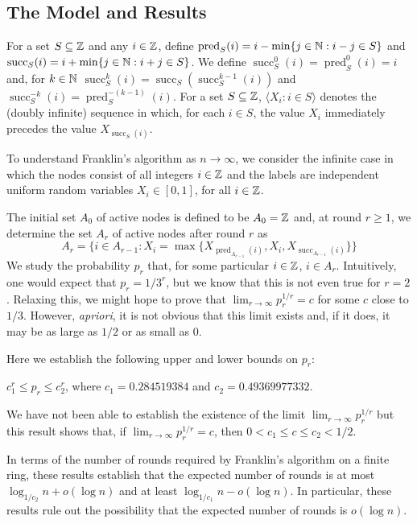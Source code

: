 \documentclass{patmorin}
\DeclareMathOperator{\cw}{succ}
\DeclareMathOperator{\ccw}{pred}
\begin{document}
\subsection{The Model and Results}

For a set $S\subseteq\mathbb{Z}$ and any $i\in\mathbb{Z}$, define $\ccw_S(i) =
i-\min\{j\in\N: i-j\in S\}$ and $\cw_S(i) = i+\min\{j\in\N: i+j\in S\}$.
We define $\cw_S^0(i)=\ccw_S^0(i)=i$ and, for $k\in\mathbb{N}$ $\cw_S^k(i) =
\cw_S(\cw_S^{k-1}(i))$ and $\cw_S^{-k}(i) = \ccw_S^{-(k-1)}(i)$.
For a set $S\subseteq\mathbb{Z}$, $\langle X_i: i\in S\rangle$ denotes the
(doubly infinite) sequence in which, for each $i\in S$, the value $X_i$ immediately precedes
the value $X_{\cw_S(i)}$.

To understand Franklin's algorithm as $n\to\infty$, we consider the infinite
case in which the nodes consist of all integers $i\in \mathbb{Z}$ and the labels are
independent uniform random variables $X_i\in[0,1]$, for all $i\in\mathbb{Z}$.

The initial set $A_0$ of active nodes is defined to be $A_0=\mathbb{Z}$ and, at round $r\ge 1$, we determine the set $A_r$ of active nodes after round $r$ as 
\[
    A_r = \{i \in A_{r-1} : X_i = \max\{X_{\ccw_{A_{r-1}}(i)},X_i,
                                      X_{\cw_{A_{r-1}}(i)}\} \} 
\] 
We study the probability $p_r$ that, for some particular $i\in\mathbb{Z}$,
$i\in A_r$.  Intuitively, one would expect that $p_r=1/3^r$, but
we know that this is not even true for $r=2$.  Relaxing this, we might
hope to prove that $\lim_{r\to\infty} p_r^{1/r} = c$ for some $c$ close
to $1/3$.  However, \emph{apriori}, it is not obvious that this limit
exists and, if it does, it may be as large as $1/2$ or as small as $0$.

Here we establish the following upper and lower bounds on $p_r$:

\begin{thm}
   $c_1^r \le p_r \le c_2^r$, where 
   $c_1=0.284519384$ and $c_2= 0.49369977332$.
\end{thm}

We have not been able to establish the existence of the limit
$\lim_{r\to\infty} p_r^{1/r}$ but this result shows that, if
$\lim_{r\to\infty} p_r^{1/r}=c$, then $0 < c_1 \le c\le  c_2 < 1/2$.

In terms of the number of rounds required by Franklin's algorithm on
a finite ring, these results establish that the expected number of
rounds is at most $\log_{1/{c_2}} n + o(\log n)$ and at least $\log_{1/{c_1}}
n- o(\log n)$.  In particular, these results rule out the possibility
that the expected number of rounds is $o(\log n)$.
\end{document}

